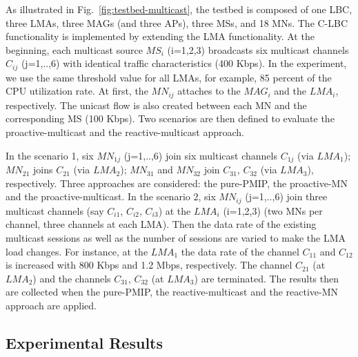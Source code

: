 As illustrated in Fig.~\ref{fig:testbed-multicast}, the testbed is composed of one LBC, three LMAs, three MAGs (and three APs), three MSs, and 18 MNs. The C-LBC functionality is implemented by extending the LMA functionality. At the beginning, each multicast source $MS_{i}$ (i=1,2,3) broadcasts six multicast channels $C_{ij}$ (j=1,..,6) with identical traffic characteristics (400 Kbps). In the experiment, we use the same threshold value for all LMAs, for example, 85 percent of the CPU utilization rate. At first, the $MN_{ij}$ attaches to the $MAG_{i}$ and the $LMA_{i}$, respectively. The unicast flow is also created between each MN and the corresponding MS (100 Kbps). Two scenarios are then defined to evaluate the proactive-multicast and the reactive-multicast approach. 

In the scenario 1, six $MN_{1j}$ (j=1,..,6) join six multicast channels $C_{1j}$ (via $LMA_{1}$); $MN_{21}$ joins $C_{21}$ (via $LMA_{2}$); $MN_{31}$ and $MN_{32}$ join $C_{31}$, $C_{32}$ (via $LMA_{3}$), respectively. Three approaches are considered: the pure-PMIP, the proactive-MN and the proactive-multicast.
In the scenario 2, six $MN_{ij}$ (j=1,..,6) join three multicast channels (say $C_{i1}$, $C_{i2}$, $C_{i3}$) at the $LMA_{i}$ (i=1,2,3) (two MNs per channel, three channels at each LMA). Then the data rate of the existing multicast sessions as well as the number of sessions are varied to make the LMA load changes. For instance, at the $LMA_{1}$ the data rate of the channel $C_{11}$ and $C_{12}$ is increased with 800 Kbps and 1.2 Mbps, respectively. The channel $C_{21}$ (at $LMA_{2}$) and the channels $C_{31}$, $C_{32}$ (at $LMA_{3}$) are terminated. The results then are collected when the pure-PMIP, the reactive-multicast and the reactive-MN approach are applied.

\subsection{Experimental Results}
